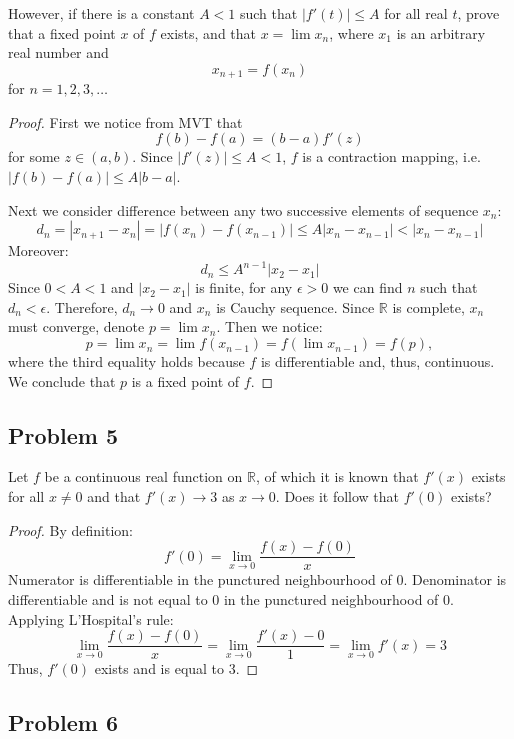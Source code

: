 \documentclass{article}
\begin{document}
\begin{tcolorbox}
However, if there is a constant $A < 1$ such that $|f'(t)| \leq A$ for all real $t$, prove that a fixed point $x$ of $f$ exists, and that $x = \lim x_n$, where $x_1$ is an arbitrary real number and
$$ x_{n+1} = f(x_n) $$
for $n = 1,2,3,\dots$
\end{tcolorbox}
\begin{proof}
First we notice from MVT that
$$ f(b)-f(a) = (b-a) f'(z) $$
for some $z \in (a,b)$. Since $|f'(z)| \leq A < 1$, $f$ is a contraction mapping, i.e. $|f(b)-f(a)| \leq A |b-a|$.

Next we consider difference between any two successive elements of sequence $x_n$:
$$ d_n = |x_{n+1} - x_{n}| = |f(x_{n}) - f(x_{n-1})| \leq A |x_{n}-x_{n-1}| < |x_{n}-x_{n-1}| $$
Moreover:
$$ d_n \leq A^{n-1} |x_2 - x_1| $$
Since $0<A<1$ and $|x_2-x_1|$ is finite, for any $\epsilon>0$ we can find $n$ such that $d_n < \epsilon$. Therefore, $d_n \to 0$ and $x_n$ is Cauchy sequence. Since $\mathbb{R}$ is complete, $x_n$ must converge, denote $p = \lim x_n$. Then we notice:
$$ p = \lim x_n = \lim f(x_{n-1}) = f (\lim x_{n-1}) = f(p), $$
where the third equality holds because $f$ is differentiable and, thus, continuous. We conclude that $p$ is a fixed point of $f$.
\end{proof}


\subsection*{Problem 5}

\begin{tcolorbox}
Let $f$ be a continuous real function on $\mathbb{R}$, of which it is known that $f'(x)$ exists for all $x \neq 0$
and that $f'(x) \to 3$ as $x \to 0$. Does it follow that $f'(0)$ exists?
\end{tcolorbox}
\begin{proof}
By definition:
$$ f'(0) = \lim_{x \to 0} \frac{f(x)-f(0)}{x} $$
Numerator is differentiable in the punctured neighbourhood of $0$. Denominator is differentiable and is not equal to $0$ in the punctured neighbourhood of $0$. Applying L'Hospital's rule:
$$ \lim_{x \to 0} \frac{f(x)-f(0)}{x} = \lim_{x \to 0} \frac{f'(x)-0}{1} =  \lim_{x \to 0} f'(x) = 3 $$
Thus, $f'(0)$ exists and is equal to $3$.
\end{proof}


\subsection*{Problem 6}
\end{document}

